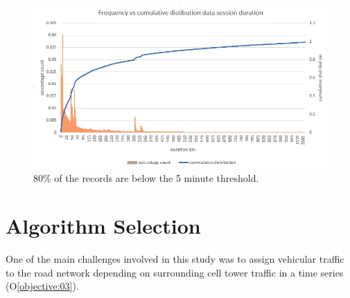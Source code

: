 \documentclass[12pt, a4paper]{report}
\theoremstyle{definition}
\theoremstyle{definition}%
\theoremstyle{definition}%
\theoremstyle{definition}%
\theoremstyle{definition}%
\theoremstyle{definition}%
\begin{document}
 
 
 \begin{figure}
 	\includegraphics[scale=0.75]{data_session_duration.jpg}
 	\centering
 	\caption[Data session duration cummultive distribution]{80\% of the records are below the 5 minute threshold.}
 	\label{fig:data_session_duration}
 \end{figure}
 






\section{Algorithm Selection} \label{section:methodology:algorithm_selection}

One of the main challenges involved in this study was to assign vehicular traffic to the road network depending on surrounding cell tower traffic in a time series (O\ref{objective:03}).
\end{document}
